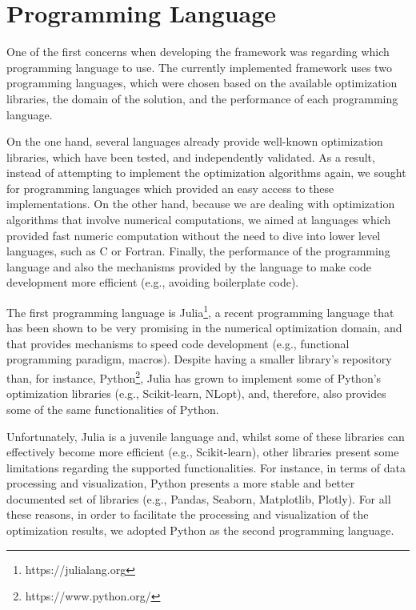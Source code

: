 \section{Programming Language}
One of the first concerns when developing the framework was regarding which programming language to use. The currently implemented framework uses two programming languages, which were chosen based on the available optimization libraries, the domain of the solution, and the performance of each programming language.
 
On the one hand, several languages already provide well-known optimization libraries, which have been tested, and independently validated. As a result, instead of attempting to implement the optimization algorithms again, we sought for programming languages which provided an easy access to these implementations. On the other hand, because we are dealing with optimization algorithms that involve numerical computations, we aimed at languages which provided fast numeric computation without the need to dive into lower level languages, such as C or Fortran. Finally, the performance of the programming language and also the mechanisms provided by the language to make code development more efficient (e.g., avoiding boilerplate code).

The first programming language is Julia\footnote{https://julialang.org}, a recent programming language that has been shown to be very promising in the numerical optimization domain, and that provides mechanisms to speed code development (e.g., functional programming paradigm, macros). Despite having a smaller library's repository than, for instance, Python\footnote{https://www.python.org/}, Julia has grown to implement some of Python's optimization libraries (e.g., Scikit-learn, NLopt), and, therefore, also provides some of the same functionalities of Python.   

Unfortunately, Julia is a juvenile language and, whilst some of these libraries can effectively become more efficient (e.g., Scikit-learn), other libraries present some limitations regarding the supported functionalities. For instance, in terms of data processing and visualization, Python presents a more stable  and better documented set of libraries (e.g., Pandas, Seaborn, Matplotlib, Plotly). For all these reasons, in order to facilitate the processing and visualization of the optimization results, we adopted Python as the second programming language.

